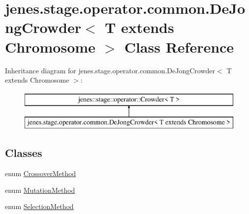 \hypertarget{classjenes_1_1stage_1_1operator_1_1common_1_1_de_jong_crowder_3_01_t_01extends_01_chromosome_01_4}{\section{jenes.\-stage.\-operator.\-common.\-De\-Jong\-Crowder$<$ T extends Chromosome $>$ Class Reference}
\label{classjenes_1_1stage_1_1operator_1_1common_1_1_de_jong_crowder_3_01_t_01extends_01_chromosome_01_4}
}
Inheritance diagram for jenes.\-stage.\-operator.\-common.\-De\-Jong\-Crowder$<$ T extends Chromosome $>$\-:\begin{figure}[H]
\begin{center}
\leavevmode
\includegraphics[height=2.000000cm]{classjenes_1_1stage_1_1operator_1_1common_1_1_de_jong_crowder_3_01_t_01extends_01_chromosome_01_4}
\end{center}
\end{figure}
\subsection*{Classes}
\begin{DoxyCompactItemize}
\item 
enum \hyperlink{enumjenes_1_1stage_1_1operator_1_1common_1_1_de_jong_crowder_3_01_t_01extends_01_chromosome_01_4_1_1_crossover_method}{Crossover\-Method}
\item 
enum \hyperlink{enumjenes_1_1stage_1_1operator_1_1common_1_1_de_jong_crowder_3_01_t_01extends_01_chromosome_01_4_1_1_mutation_method}{Mutation\-Method}
\item 
enum \hyperlink{enumjenes_1_1stage_1_1operator_1_1common_1_1_de_jong_crowder_3_01_t_01extends_01_chromosome_01_4_1_1_selection_method}{Selection\-Method}
\end{DoxyCompactItemize}
